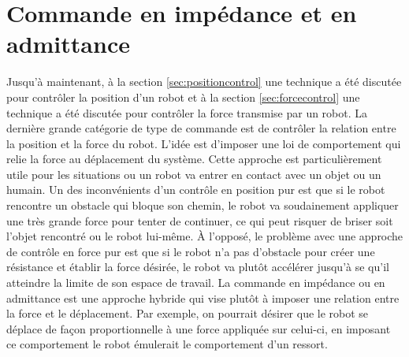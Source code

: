 \section{Commande en impédance et en admittance}
\label{sec:impcontrol}

Jusqu'à maintenant, à la section \ref{sec:positioncontrol} une technique a été discutée pour contrôler la position d'un robot et à la section \ref{sec:forcecontrol} une technique a été discutée pour contrôler la force transmise par un robot. La dernière grande catégorie de type de commande est de contrôler la relation entre la position et la force du robot. L'idée est d'imposer une loi de comportement qui relie la force au déplacement du système. Cette approche est particulièrement utile pour les situations ou un robot va entrer en contact avec un objet ou un humain. Un des inconvénients d'un contrôle en position pur est que si le robot rencontre un obstacle qui bloque son chemin, le robot va soudainement appliquer une très grande force pour tenter de continuer, ce qui peut risquer de briser soit l'objet rencontré ou le robot lui-même. À l'opposé, le problème avec une approche de contrôle en force pur est que si le robot n'a pas d'obstacle pour créer une résistance et établir la force désirée, le robot va plutôt accélérer jusqu'à se qu'il atteindre la limite de son espace de travail. La commande en impédance ou en admittance est une approche hybride qui vise plutôt à imposer une relation entre la force et le déplacement. Par exemple, on pourrait désirer que le robot se déplace de façon proportionnelle à une force appliquée sur celui-ci, en imposant ce comportement le robot émulerait le comportement d'un ressort.

